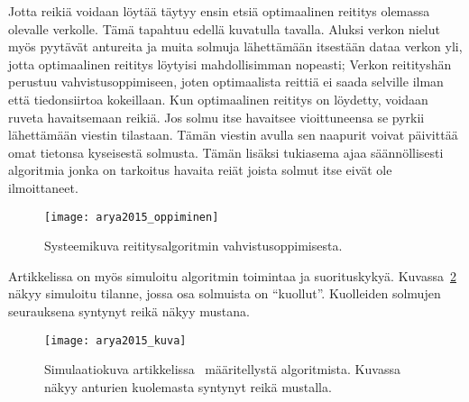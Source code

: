 Jotta reikiä voidaan löytää täytyy ensin etsiä optimaalinen reititys olemassa
olevalle verkolle. Tämä tapahtuu edellä kuvatulla tavalla. Aluksi verkon nielut
myös pyytävät antureita ja muita solmuja lähettämään itsestään dataa verkon
yli, jotta optimaalinen reititys löytyisi mahdollisimman nopeasti; Verkon
reitityshän perustuu vahvistusoppimiseen, joten optimaalista reittiä ei saada
selville ilman että tiedonsiirtoa kokeillaan. Kun optimaalinen reititys on
löydetty, voidaan ruveta havaitsemaan reikiä. Jos solmu itse havaitsee
vioittuneensa se pyrkii lähettämään viestin tilastaan. Tämän viestin avulla sen
naapurit voivat päivittää omat tietonsa kyseisestä solmusta. Tämän lisäksi
tukiasema ajaa säännöllisesti algoritmia jonka on tarkoitus havaita reiät
joista solmut itse eivät ole ilmoittaneet.

\begin{figure}[h]
  \centering
  \texttt{[image: arya2015\_oppiminen]}
  \caption{Systeemikuva reititysalgoritmin vahvistusoppimisesta.~\parencite{Arya2015}}
\label{fig:arya2015_oppiminen}
\end{figure}

Artikkelissa on myös simuloitu algoritmin toimintaa ja suorituskykyä.
Kuvassa~\ref{fig:arya2015} näkyy simuloitu tilanne, jossa osa solmuista on
``kuollut''. Kuolleiden solmujen seurauksena syntynyt reikä näkyy mustana.

\begin{figure}[h]
  \centering
  \texttt{[image: arya2015\_kuva]}
  \caption{Simulaatiokuva artikkelissa~\cite{Arya2015} määritellystä
algoritmista. Kuvassa näkyy anturien kuolemasta syntynyt reikä mustalla.}
\label{fig:arya2015}
\end{figure}

